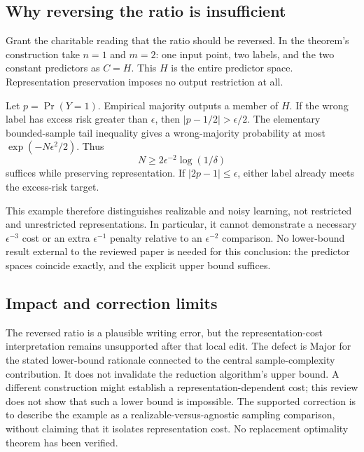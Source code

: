 \documentclass[10pt]{article}
\begin{document}
\subsection*{Why reversing the ratio is insufficient}
Grant the charitable reading that the ratio should be reversed. In the theorem’s construction take \(n=1\) and \(m=2\): one input point, two labels, and the two constant predictors as \(C=H\). This \(H\) is the entire predictor space. Representation preservation imposes no output restriction at all.\par
Let \(p=\Pr(Y=1)\). Empirical majority outputs a member of \(H\). If the wrong label has excess risk greater than \(\epsilon\), then \(|p-1/2|>\epsilon/2\). The elementary bounded-sample tail inequality gives a wrong-majority probability at most \(\exp(-N\epsilon^2/2)\). Thus \[N\ge 2\epsilon^{-2}\log(1/\delta)\] suffices while preserving representation. If \(|2p-1|\le\epsilon\), either label already meets the excess-risk target.\par
This example therefore distinguishes realizable and noisy learning, not restricted and unrestricted representations. In particular, it cannot demonstrate a necessary \(\epsilon^{-3}\) cost or an extra \(\epsilon^{-1}\) penalty relative to an \(\epsilon^{-2}\) comparison. No lower-bound result external to the reviewed paper is needed for this conclusion: the predictor spaces coincide exactly, and the explicit upper bound suffices.\par
\subsection*{Impact and correction limits}
The reversed ratio is a plausible writing error, but the representation-cost interpretation remains unsupported after that local edit. The defect is Major for the stated lower-bound rationale connected to the central sample-complexity contribution. It does not invalidate the reduction algorithm’s upper bound. A different construction might establish a representation-dependent cost; this review does not show that such a lower bound is impossible. The supported correction is to describe the example as a realizable-versus-agnostic sampling comparison, without claiming that it isolates representation cost. No replacement optimality theorem has been verified.\par
\end{document}
